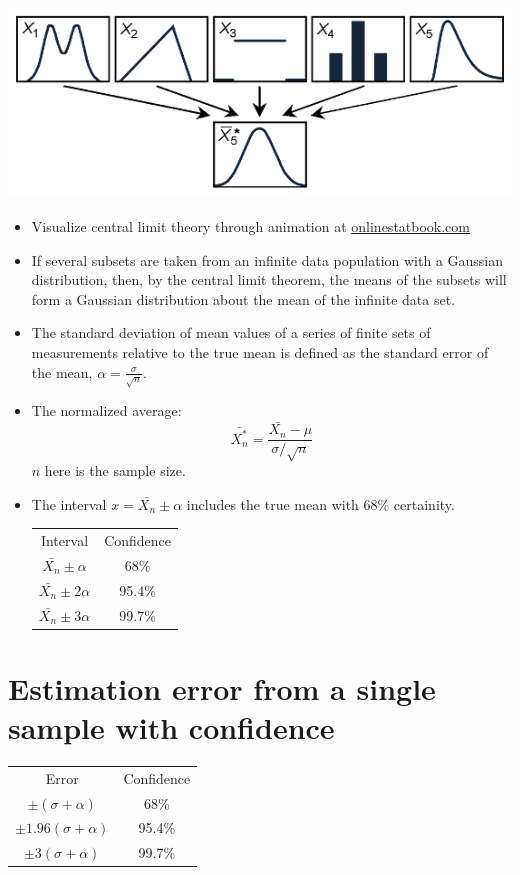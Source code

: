 \documentclass[a4paper,11pt]{book}
\begin{document}
\includegraphics[scale=0.4]{clt}
\begin{itemize}
\item Visualize central limit theory through animation at \href{http://onlinestatbook.com/stat_sim/sampling_dist/index.html}{onlinestatbook.com}
\item If several subsets are taken from an infinite data
population with a Gaussian distribution, then, by the central limit theorem, the means of the subsets will form a Gaussian distribution about
the mean of the infinite data set.
\item The standard deviation of mean values of a
series of finite sets of measurements relative to
the true mean is defined as the standard error
of the mean, $\alpha = \frac{\sigma}{\sqrt{n}}$.
\item The normalized average: 
\begin{equation}
\bar{X_{n}^{*}} = \frac{\bar{X_n} - \mu }{ \sigma / \sqrt{n} }
\end{equation}
$n$ here is the sample size.
\item The interval $x = \bar{X_n} \pm \alpha$ includes the true mean with 68\% certainity. \\
\begin{tabular}{|c|c|}
\hline 
Interval & Confidence \\ 
$\bar{X_n} \pm \alpha$ & 68\% \\ 
$\bar{X_n} \pm 2\alpha$ & 95.4\% \\ 
$\bar{X_n} \pm 3\alpha$ & 99.7\% \\ 
\hline 
\end{tabular} 
\end{itemize}

\section*{Estimation error from a single sample with confidence}

\begin{tabular}{|c|c|}
\hline 
Error & Confidence \\ 
$\pm (\sigma + \alpha )$ & 68\% \\ 
$\pm 1.96(\sigma + \alpha )$ & 95.4\% \\ 
$\pm 3(\sigma + \alpha )$ & 99.7\% \\ 
\hline 
\end{tabular}
\end{document}
